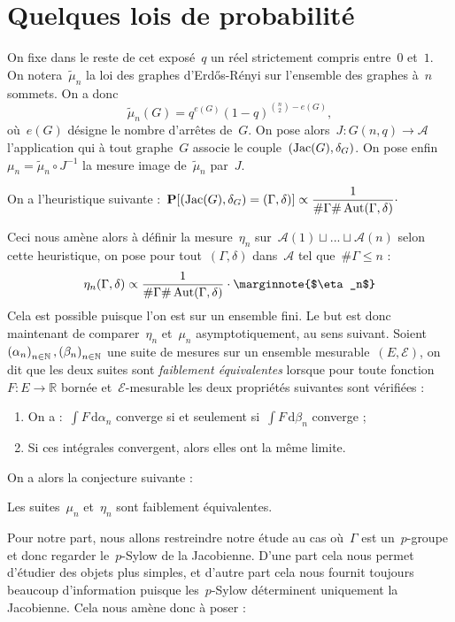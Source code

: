 \section{Quelques lois de probabilité}
	On fixe dans le reste de cet exposé~$q$ un réel strictement compris entre~$0$ et~$1$. On notera~$\tilde{\mu}_n$ la loi des graphes d'Erd\H{o}s-Rényi sur l'ensemble des graphes à~$n$ sommets. On a donc
	\[
		\tilde{\mu}_n(G) = q^{e(G)}(1-q)^{\binom{n}{2}-e(G)},
	\]
	où~$e(G)$ désigne le nombre d'arrêtes de~$G$. On pose alors~$J:G(n,q)\rightarrow \mathscr{A}$ l'application qui à tout graphe~$G$ associe le couple~$(\operatorname{Jac}(G),\delta_G)$. On pose enfin~$\mu_n = \tilde{\mu}_n \circ J^{-1}$ la mesure image de~$\tilde{\mu}_n$ par~$J$.
	\begin{heur}
		On a l'heuristique suivante :~$\displaystyle\bm{\mathrm{P}}[(\operatorname{Jac}(G),\delta_G)=(\Gamma,\delta)] \propto \frac{1}{\#\Gamma\#\operatorname{Aut}(\Gamma,\delta)}\cdot$
	\end{heur}
	Ceci nous amène alors à définir la mesure~$\eta_n$ sur~$\mathscr{A}(1)\sqcup ...\sqcup \mathscr{A}(n)$ selon cette heuristique, on pose pour tout~$(\Gamma,\delta)$ dans~$\mathscr{A}$ tel que~$\#\Gamma \leq n$ :
	\[
		\eta_n(\Gamma,\delta) \propto\frac{1}{\#\Gamma\#\Aut(\Gamma,\delta)}\cdot
		\text{\marginnote{$\eta_n$}}
	\]
	Cela est possible puisque l'on est sur un ensemble fini. Le but est donc maintenant de comparer~$\eta_n$ et~$\mu_n$ asymptotiquement, au sens suivant. Soient~$\suite{\alpha},\suite{\beta}$ une suite de mesures sur un ensemble mesurable~$(E,\mathcal{E})$, on dit que les deux suites sont \emph{faiblement équivalentes} lorsque pour toute fonction~$F : E\rightarrow\mathbb{R}$ bornée et~$\mathcal{E}$-mesurable les deux propriétés suivantes sont vérifiées :
	\begin{enumerate}
		\item On a :~$\int F\,\mathrm{d}\alpha_n$ converge si et seulement si~$\int F\,\mathrm{d}\beta_n$ converge ;
		\item Si ces intégrales convergent, alors elles ont la même limite.
	\end{enumerate}
	 On a alors la conjecture suivante :
	\begin{conj}
		Les suites~$\mu_n$ et~$\eta_n$ sont faiblement équivalentes.
	\end{conj}
	Pour notre part, nous allons restreindre notre étude au cas où~$\Gamma$ est un~$p$-groupe et donc regarder le~$p$-Sylow de la Jacobienne. D'une part cela nous permet d'étudier des objets plus simples, et d'autre part cela nous fournit toujours beaucoup d'information puisque les~$p$-Sylow déterminent uniquement la Jacobienne. Cela nous amène donc à poser :
